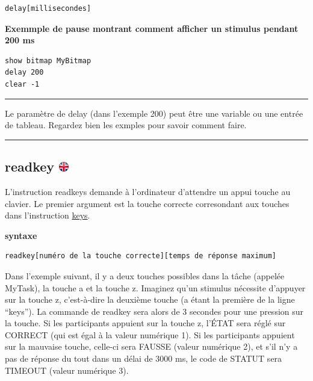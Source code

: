 \documentclass[
]{book}
\begin{document}
\begin{verbatim}
delay[millisecondes]
\end{verbatim}

\textbf{Exemmple de pause montrant comment afficher un stimulus pendant
200 ms}

\begin{verbatim}
show bitmap MyBitmap
delay 200
clear -1
\end{verbatim}

\begin{center}\rule{0.5\linewidth}{\linethickness}\end{center}

Le paramètre de delay (dans l'exemple 200) peut être une variable ou une
entrée de tableau. Regardez bien les exmples pour savoir comment faire.

\begin{center}\rule{0.5\linewidth}{\linethickness}\end{center}

\hypertarget{readkey}{%
\subsection[readkey ]{\texorpdfstring{readkey
\href{https://www.psytoolkit.org/doc3.2.0/syntax.html\#task-readkey}{\protect\includegraphics{img/ukflag.png}}}{readkey }}\label{readkey}}

L'instruction readkeys demande à l'ordinateur d'attendre un appui touche
au clavier. Le premier argument est la touche correcte corresondant aux
touches dans l'instruction \protect\hyperlink{keys}{keys}.

\textbf{syntaxe}

\begin{verbatim}
readkey[numéro de la touche correcte][temps de réponse maximum]
\end{verbatim}

Dans l'exemple suivant, il y a deux touches possibles dans la tâche
(appelée MyTask), la touche a et la touche z. Imaginez qu'un stimulus
nécessite d'appuyer sur la touche z, c'est-à-dire la deuxième touche (a
étant la première de la ligne ``keys''). La commande de readkey sera
alors de 3 secondes pour une pression sur la touche. Si les participants
appuient sur la touche z, l'ÉTAT sera réglé sur CORRECT (qui est égal à
la valeur numérique 1). Si les participants appuient sur la mauvaise
touche, celle-ci sera FAUSSE (valeur numérique 2), et s'il n'y a pas de
réponse du tout dans un délai de 3000 ms, le code de STATUT sera TIMEOUT
(valeur numérique 3).
\end{document}
